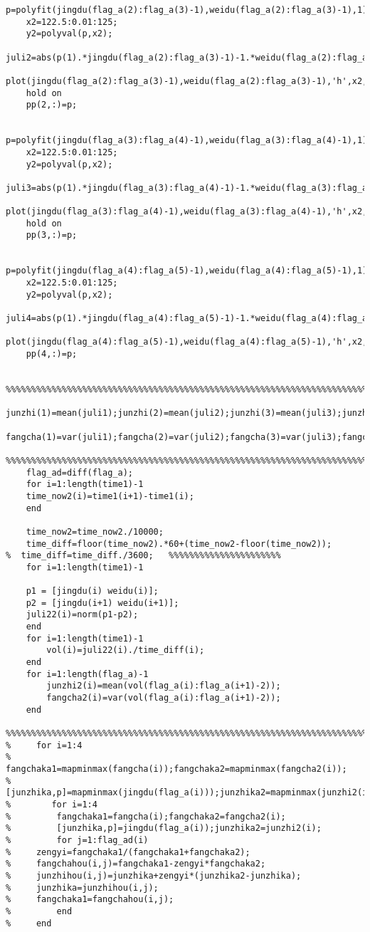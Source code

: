 \begin{appendix}
\begin{lstlisting}[caption=Kalman.m]
    p=polyfit(jingdu(flag_a(2):flag_a(3)-1),weidu(flag_a(2):flag_a(3)-1),1);
    x2=122.5:0.01:125;
    y2=polyval(p,x2);
    juli2=abs(p(1).*jingdu(flag_a(2):flag_a(3)-1)-1.*weidu(flag_a(2):flag_a(3)-1)+p(2))/sqrt(p(1)^2+1);
    plot(jingdu(flag_a(2):flag_a(3)-1),weidu(flag_a(2):flag_a(3)-1),'h',x2,y2)
    hold on
    pp(2,:)=p;

    p=polyfit(jingdu(flag_a(3):flag_a(4)-1),weidu(flag_a(3):flag_a(4)-1),1);
    x2=122.5:0.01:125;
    y2=polyval(p,x2);
    juli3=abs(p(1).*jingdu(flag_a(3):flag_a(4)-1)-1.*weidu(flag_a(3):flag_a(4)-1)+p(2))/sqrt(p(1)^2+1);
    plot(jingdu(flag_a(3):flag_a(4)-1),weidu(flag_a(3):flag_a(4)-1),'h',x2,y2)
    hold on
    pp(3,:)=p;

    p=polyfit(jingdu(flag_a(4):flag_a(5)-1),weidu(flag_a(4):flag_a(5)-1),1);
    x2=122.5:0.01:125;
    y2=polyval(p,x2);
    juli4=abs(p(1).*jingdu(flag_a(4):flag_a(5)-1)-1.*weidu(flag_a(4):flag_a(5)-1)+p(2))/sqrt(p(1)^2+1);
    plot(jingdu(flag_a(4):flag_a(5)-1),weidu(flag_a(4):flag_a(5)-1),'h',x2,y2)
    pp(4,:)=p;
    
    %%%%%%%%%%%%%%%%%%%%%%%%%%%%%%%%%%%%%%%%%%%%%%%%%%%%%%%%%%%%%%%%%%%%%%%%%%%%%%%%%%%%%%%%%%%
    junzhi(1)=mean(juli1);junzhi(2)=mean(juli2);junzhi(3)=mean(juli3);junzhi(4)=mean(juli4); 
    fangcha(1)=var(juli1);fangcha(2)=var(juli2);fangcha(3)=var(juli3);fangcha(4)=var(juli4);
    %%%%%%%%%%%%%%%%%%%%%%%%%%%%%%%%%%%%%%%%%%%%%%%%%%%%%%%%%%%%%%%%%%%%%%%%%%%%%%%%%%%%%%%%%%%%%%%%%%%%%%%%%%%%%%
    flag_ad=diff(flag_a);
    for i=1:length(time1)-1
    time_now2(i)=time1(i+1)-time1(i);
    end
    
    time_now2=time_now2./10000;
    time_diff=floor(time_now2).*60+(time_now2-floor(time_now2));
%  time_diff=time_diff./3600;   %%%%%%%%%%%%%%%%%%%%%%
    for i=1:length(time1)-1
        
    p1 = [jingdu(i) weidu(i)];
    p2 = [jingdu(i+1) weidu(i+1)];
    juli22(i)=norm(p1-p2);
    end
    for i=1:length(time1)-1
        vol(i)=juli22(i)./time_diff(i);
    end
    for i=1:length(flag_a)-1
        junzhi2(i)=mean(vol(flag_a(i):flag_a(i+1)-2));
        fangcha2(i)=var(vol(flag_a(i):flag_a(i+1)-2));
    end
    %%%%%%%%%%%%%%%%%%%%%%%%%%%%%%%%%%%%%%%%%%%%%%%%%%%%%%%%%%%%%%%%%%%%%%%%
%     for i=1:4
%         fangchaka1=mapminmax(fangcha(i));fangchaka2=mapminmax(fangcha2(i));
%         [junzhika,p]=mapminmax(jingdu(flag_a(i)));junzhika2=mapminmax(junzhi2(i));
%        for i=1:4
%         fangchaka1=fangcha(i);fangchaka2=fangcha2(i);
%         [junzhika,p]=jingdu(flag_a(i));junzhika2=junzhi2(i);
%         for j=1:flag_ad(i)
%     zengyi=fangchaka1/(fangchaka1+fangchaka2);
%     fangchahou(i,j)=fangchaka1-zengyi*fangchaka2;
%     junzhihou(i,j)=junzhika+zengyi*(junzhika2-junzhika);
%     junzhika=junzhihou(i,j);
%     fangchaka1=fangchahou(i,j);
%         end
%     end
    

\end{lstlisting}
\end{appendix}
